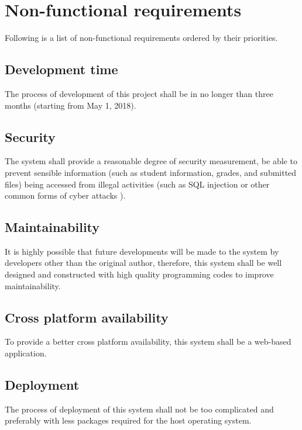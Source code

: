 \pagebreak

\section{Non-functional requirements}
Following is a list of non-functional requirements ordered by their priorities.

\subsection{Development time}
The process of development of this project shall be in no longer than three
months (starting from May 1, 2018).

\subsection{Security}
The system shall provide a reasonable degree of security measurement, 
be able to
prevent sensible information (such as student information, grades, and
submitted files) being accessed from illegal activities (such as SQL injection 
or other common forms of cyber attacks \cite{cyberAttacks}).

\subsection{Maintainability}
It is highly possible that future developments will be made to the system by
developers other than the original author, therefore, this system shall be
well designed and constructed with high quality programming codes to improve 
maintainability.

\subsection{Cross platform availability}
To provide a better cross platform availability, this system shall be a
web-based application.

\subsection{Deployment}
The process of deployment of this system shall not be too complicated and
preferably with less packages required for the host operating system.